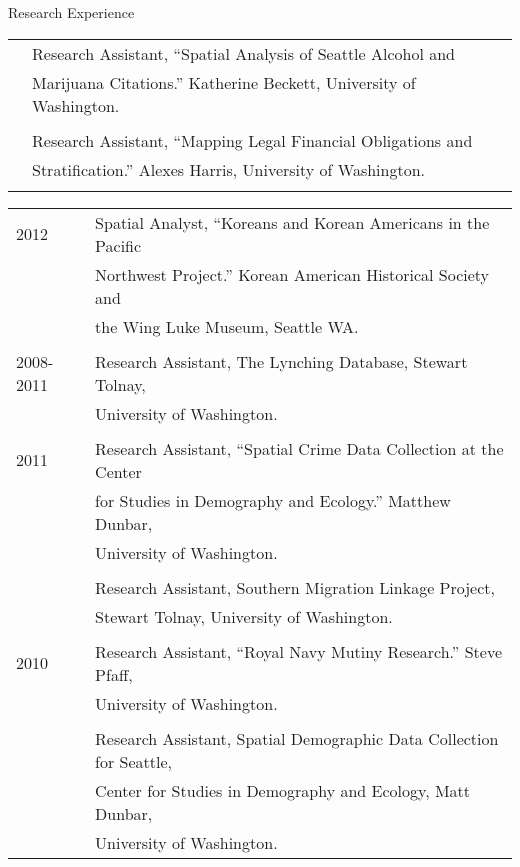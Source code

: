 \documentclass{resume} %
\begin{document}
\begin{rSection}{Research Experience}
\begin{tabular}{ @{} >{}l @{\hspace{6ex}} l }
	 		& Research Assistant, ``Spatial Analysis of Seattle Alcohol and\\
			& Marijuana Citations.'' Katherine Beckett, University of Washington.\\\\

			& Research Assistant, ``Mapping Legal Financial Obligations and\\
			& Stratification.'' Alexes Harris, University of Washington.\\\\
\end{tabular}

\begin{tabular}{ @{} >{}l @{\hspace{6ex}} l }
2012		& Spatial Analyst, ``Koreans and Korean Americans in the Pacific\\
			& Northwest Project.'' Korean American Historical Society and\\
			& the Wing Luke Museum, Seattle WA.\\\\

2008-2011 	& Research Assistant, The Lynching Database, Stewart Tolnay,\\
			& University of Washington.\\\\

2011		& Research Assistant, ``Spatial Crime Data Collection at the Center\\
			& for Studies in Demography and Ecology.'' Matthew Dunbar,\\
			& University of Washington.\\\\

	 		& Research Assistant, Southern Migration Linkage Project,\\
			& Stewart Tolnay, University of Washington.\\\\

2010 		& Research Assistant, ``Royal Navy Mutiny Research.'' Steve Pfaff,\\
			& University of Washington.\\\\

	 		& Research Assistant, Spatial Demographic Data Collection for Seattle,\\
			&  Center for Studies in Demography and Ecology, Matt Dunbar, \\
			& University of Washington.

\end{tabular}
\vspace{5mm}
\end{rSection}
\end{document}
